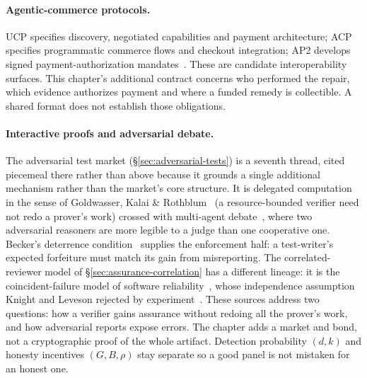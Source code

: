 \documentclass[11pt,a4paper]{article}
\theoremstyle{definition}
\theoremstyle{definition}
\theoremstyle{remark}
\begin{document}
\paragraph{Agentic-commerce protocols.} UCP specifies discovery, negotiated
capabilities and payment architecture; ACP specifies programmatic commerce
flows and checkout integration; AP2 develops signed payment-authorization
mandates~. These are candidate
interoperability surfaces. This chapter's additional contract concerns who
performed the repair, which evidence authorizes payment and where a funded
remedy is collectible. A shared format does not establish those obligations.

\paragraph{Interactive proofs and adversarial debate.} The adversarial test market
(\S\ref{sec:adversarial-tests}) is a seventh thread, cited piecemeal there rather
than above because it grounds a single additional mechanism rather than the market's
core structure. It is delegated computation in the sense of Goldwasser, Kalai \&
Rothblum~ (a resource-bounded verifier need not redo a
prover's work) crossed with multi-agent debate~, where two
adversarial reasoners are more legible to a judge than one cooperative one. Becker's
deterrence condition~ supplies the enforcement half: a test-writer's
expected forfeiture must match its gain from misreporting.
The correlated-reviewer model of \S\ref{sec:assurance-correlation} has a
different lineage: it is the coincident-failure model of software
reliability~, whose independence
assumption Knight and Leveson rejected by experiment~.
These sources address two questions: how a verifier gains assurance without
redoing all the prover's work, and how adversarial reports expose errors. The chapter
adds a market and bond, not a cryptographic proof of the whole artifact.
Detection probability $(d,k)$ and honesty incentives $(G,B,\rho)$ stay separate
so a good panel is not mistaken for an honest one.
\end{document}
